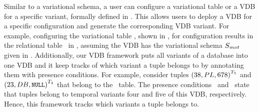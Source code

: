 




Similar to a variational schema, a user
can configure a variational table or a VDB for a specific variant, formally defined in
. This allows users to deploy a VDB for a
specific configuration and generate the corresponding VDB variant.
For example, configuring the variational table \empbio, shown in ,
for configuration \setDef{\vThree, \edu, \tOne} results in the relational table \empbio\
in , assuming the VDB has the variational schema $\vSch_\mot$
given in \exref{vsch-mot}.
%
Additionally, 
our VDB framework puts all variants of a database into
one VDB 
and it keep tracks of which variant a tuple belongs to by 
annotating them with presence conditions. 
For example, consider tuples
\ensuremath{\annot [\tFive] {(38, PL, 678)}}
and 
\ensuremath{\annot [\tFour] {(23, DB, \nul)}}
that belong to the \ecourse\ table. 
The presence conditions \tFive\ and \tFour\ state that tuples belong to temporal
variants four and five of this VDB, respectively.
Hence, this framework tracks which variants a tuple belongs to.


